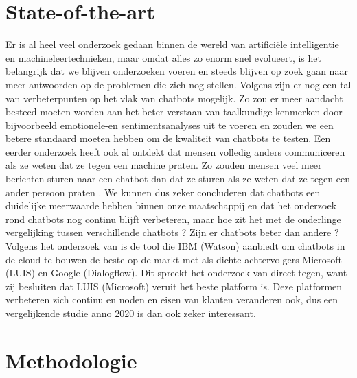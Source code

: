 
\section{State-of-the-art}
\label{sec:state-of-the-art}
Er is al heel veel onderzoek gedaan binnen de wereld van artificiële intelligentie en machineleertechnieken, maar omdat alles zo enorm snel evolueert, is het belangrijk dat we blijven onderzoeken voeren en steeds blijven op zoek gaan naar meer antwoorden op de problemen die zich nog stellen. Volgens  \textcite{Hussain2019} zijn er nog een tal van verbeterpunten op het vlak van chatbots mogelijk. Zo zou er meer aandacht besteed moeten worden aan het beter verstaan van taalkundige kenmerken door bijvoorbeeld emotionele-en sentimentsanalyses uit te voeren en zouden we een betere standaard moeten hebben om de kwaliteit van chatbots te testen. Een eerder onderzoek heeft ook al ontdekt dat mensen volledig anders communiceren als ze weten dat ze tegen een machine praten. Zo zouden mensen veel meer berichten sturen naar een chatbot dan dat ze sturen als ze weten dat ze tegen een ander persoon praten \autocite{Hill2015} .
We kunnen dus zeker concluderen dat chatbots een duidelijke meerwaarde hebben binnen onze maatschappij en dat het onderzoek rond chatbots nog continu blijft verbeteren, maar hoe zit het met de onderlinge vergelijking tussen verschillende chatbots ? Zijn er chatbots beter dan andere ? Volgens het onderzoek van \textcite{Russis2018} is de tool die IBM (Watson) aanbiedt om chatbots in de cloud te bouwen de beste op de markt met als dichte achtervolgers Microsoft (LUIS) en Google (Dialogflow). Dit spreekt het onderzoek van \textcite{Langen2017} direct tegen, want zij besluiten dat LUIS (Microsoft) veruit het beste platform is. Deze platformen verbeteren zich continu en noden en eisen van klanten veranderen ook, dus een vergelijkende studie anno 2020 is dan ook zeker interessant. 


\section{Methodologie}
\label{sec:methodologie}

